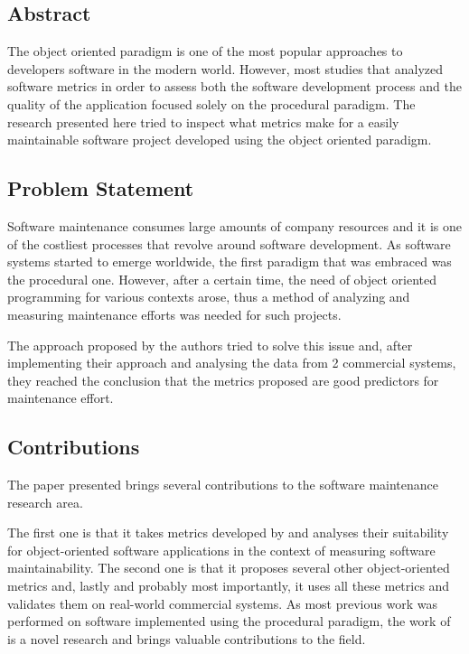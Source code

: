 \documentclass[a4paper,portrait,12pt]{article}
\begin{document}
\subsection{Abstract}

The object oriented paradigm is one of the most popular approaches to developers
software in the modern world. However, most studies that analyzed software 
metrics in order to assess both the software development process and the
quality of the application focused solely on the procedural paradigm. 
The research presented here tried to inspect what metrics make for a easily
maintainable software project developed using the object oriented paradigm.

\subsection{Problem Statement}

Software maintenance consumes large amounts of company resources and it is
one of the costliest processes that revolve around software development.
As software systems started to emerge worldwide, the first paradigm that
was embraced was the procedural one. However, after a certain time, the need
of object oriented programming for various contexts arose, thus a method of
analyzing and measuring maintenance efforts was needed for such projects.

The approach proposed by the authors tried to solve this issue and, after 
implementing their approach and analysing the data from 2 commercial systems,
they reached the conclusion that the metrics proposed are good predictors
for maintenance effort.

\subsection{Contributions}

The paper presented brings several contributions to the software maintenance
research area. 

The first one is that it takes metrics developed by \citet{chidamber1994metrics} 
and analyses their suitability for object-oriented software applications in the 
context of measuring software maintainability. The second one is that it proposes 
several other object-oriented metrics and, lastly and probably most importantly, it 
uses all these metrics and validates them on real-world commercial systems. 
As most previous work was performed on software implemented using
the procedural paradigm, the work of \citet{li1993maintenance} is a novel research
and brings valuable contributions to the field.
\end{document}
